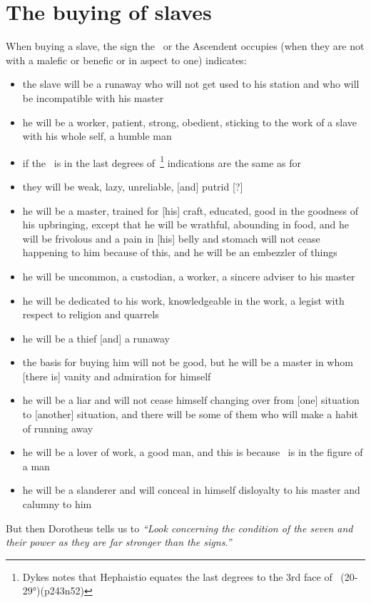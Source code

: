 \section{The buying of slaves}
When buying a slave, the sign the  \Moon\, or the Ascendent occupies (when they are not with a malefic or benefic or in aspect to one) indicates:
\begin{itemize}[topsep=0em,itemsep=0em]
\item[\Aries] the slave will be a runaway who will not get used to his station and who will be incompatible with his master
\item[\Taurus] he will be a worker, patient, strong, obedient, sticking to the work of a slave with his whole self, a humble man
\item[\Gemini] if the \Moon\, is in the last degrees of \Gemini\,\footnote{Dykes notes that Hephaistio equates the last degrees to the 3rd face of \Gemini\, (20-29°)(p243n52)} indications are the same as for \Taurus
\item[\Cancer] they will be weak, lazy, unreliable, [and] putrid [?]
\item[\Leo] he will be a master, trained for [his] craft, educated, good in the goodness of his upbringing, except that he will be wrathful, abounding in food, and he will be frivolous and a pain in [his] belly and stomach will not cease happening to him because of this, and he will be an embezzler of things
\item[\Virgo] he will be uncommon, a custodian, a worker, a sincere adviser to his master
\item[\Libra] he will be dedicated to his work, knowledgeable in the work, a legist with respect to religion and quarrels
\item[\Scorpio] he will be a thief [and] a runaway
\item[\Sagittarius] the basis for buying him will not be good, but he will be a master in whom [there is] vanity and admiration for himself
\item[\Capricorn] he will be a liar and will not cease himself changing over from [one] situation to [another] situation, and there will be some of them who will make a habit of running away
\item[\Aquarius]  he will be a lover of work, a good man, and this is because \Aquarius\, is in the figure of a man
\item[\Pisces]  he will be a slanderer and will conceal in himself disloyalty to his master and calumny to him
\end{itemize}

But then Dorotheus tells us to \textsl{``Look concerning the condition of the seven and their power as they are far stronger than the signs.''}